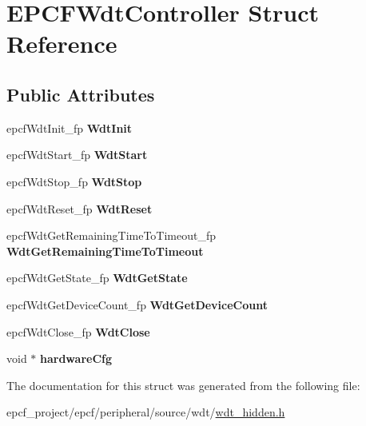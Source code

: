 \hypertarget{structEPCFWdtController}{}\section{E\+P\+C\+F\+Wdt\+Controller Struct Reference}
\label{structEPCFWdtController}
\subsection*{Public Attributes}
\begin{DoxyCompactItemize}
\item 
\mbox{\label{structEPCFWdtController_a8c323324e74fefc45e4aec06b451b725}} 
epcf\+Wdt\+Init\+\_\+fp {\bfseries Wdt\+Init}
\item 
\mbox{\label{structEPCFWdtController_a13e12ce31069aefc896abee63a9e4d93}} 
epcf\+Wdt\+Start\+\_\+fp {\bfseries Wdt\+Start}
\item 
\mbox{\label{structEPCFWdtController_ab9db1e3df3fe4b2dbe2afe93ebdb960c}} 
epcf\+Wdt\+Stop\+\_\+fp {\bfseries Wdt\+Stop}
\item 
\mbox{\label{structEPCFWdtController_a23b809e703cc5500ed84a89f70d7559f}} 
epcf\+Wdt\+Reset\+\_\+fp {\bfseries Wdt\+Reset}
\item 
\mbox{\label{structEPCFWdtController_a50de697b38f5958061aac3596673d775}} 
epcf\+Wdt\+Get\+Remaining\+Time\+To\+Timeout\+\_\+fp {\bfseries Wdt\+Get\+Remaining\+Time\+To\+Timeout}
\item 
\mbox{\label{structEPCFWdtController_a7fc204e79f8507e345b68971cefb65af}} 
epcf\+Wdt\+Get\+State\+\_\+fp {\bfseries Wdt\+Get\+State}
\item 
\mbox{\label{structEPCFWdtController_ade3b2c845a9e03c116ddf96d8e6c1f3d}} 
epcf\+Wdt\+Get\+Device\+Count\+\_\+fp {\bfseries Wdt\+Get\+Device\+Count}
\item 
\mbox{\label{structEPCFWdtController_a42f4ec231c1b743cc63d3a3102f9864a}} 
epcf\+Wdt\+Close\+\_\+fp {\bfseries Wdt\+Close}
\item 
\mbox{\label{structEPCFWdtController_adb2ef2a2b8928ce4dcc6fce6634240b3}} 
void $\ast$ {\bfseries hardware\+Cfg}
\end{DoxyCompactItemize}


The documentation for this struct was generated from the following file\+:\begin{DoxyCompactItemize}
\item 
epcf\+\_\+project/epcf/peripheral/source/wdt/\mbox{\hyperlink{wdt__hidden_8h}{wdt\+\_\+hidden.\+h}}\end{DoxyCompactItemize}
